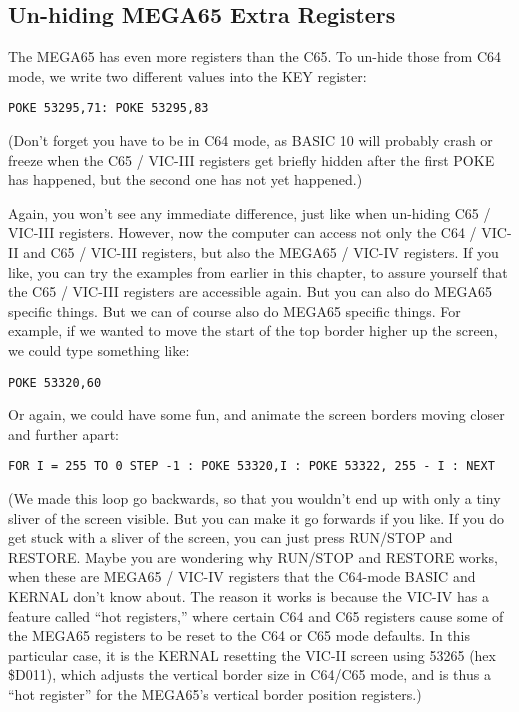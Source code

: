\subsection{Un-hiding MEGA65 Extra Registers}

The MEGA65 has even more registers than the C65.  To un-hide those from C64 mode, we write two different values into the KEY register:

\begin{tcolorbox}[colback=black,coltext=white]
\verbatimfont{\codefont}
\begin{verbatim}
POKE 53295,71: POKE 53295,83
\end{verbatim}
\end{tcolorbox}

(Don't forget you have to be in C64 mode, as BASIC 10 will probably crash or freeze when the C65 / VIC-III registers get briefly
hidden after the first POKE has happened, but the second one has not yet happened.)

Again, you won't see any immediate difference, just like when un-hiding C65 / VIC-III registers.  However, now the computer
can access not only the C64 / VIC-II and C65 / VIC-III registers, but also the MEGA65 / VIC-IV registers.  If you like,
you can try the examples from earlier in this chapter, to assure yourself that the C65 / VIC-III registers are accessible again.
But you can also do MEGA65 specific things.  But we can of course also do MEGA65 specific things. For example, if we wanted to move
the start of the top border higher up the screen, we could type something like:

\begin{tcolorbox}[colback=black,coltext=white]
\verbatimfont{\codefont}
\begin{verbatim}
POKE 53320,60
\end{verbatim}
\end{tcolorbox}

Or again, we could have some fun, and animate the screen borders moving closer and further apart:

\begin{tcolorbox}[colback=black,coltext=white]
\verbatimfont{\codefont}
\begin{verbatim}
FOR I = 255 TO 0 STEP -1 : POKE 53320,I : POKE 53322, 255 - I : NEXT
\end{verbatim}
\end{tcolorbox}

(We made this loop go backwards, so that you wouldn't end up with only a tiny sliver of the
screen visible.  But you can make it go forwards if you like. If you do get stuck with a sliver
of the screen, you can just press RUN/STOP and RESTORE.  Maybe you are wondering why RUN/STOP
and RESTORE works, when these are MEGA65 / VIC-IV registers that the C64-mode BASIC and KERNAL
don't know about.  The reason it works is because the VIC-IV has a feature called ``hot registers,''
where certain C64 and C65 registers cause some of the MEGA65 registers to be reset to the C64 or
C65 mode defaults. In this particular case, it is the KERNAL resetting the VIC-II screen using
53265 (hex \$D011), which adjusts the vertical border size in C64/C65 mode, and is thus a ``hot register''
for the MEGA65's vertical border position registers.)

